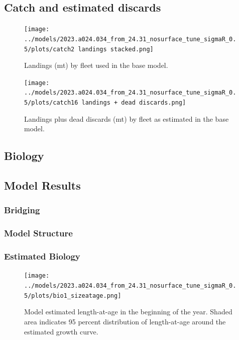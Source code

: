 \documentclass[11pt,
  english,
  letterpaper,
]{article}
\begin{document}
\hypertarget{catch-and-estimated-discards}{%
\subsection{Catch and estimated discards}\label{catch-and-estimated-discards}}

\begin{figure}
\centering
\texttt{[image: ../models/2023.a024.034\_from\_24.31\_nosurface\_tune\_sigmaR\_0.5/plots/catch2 landings stacked.png]}
\caption{Landings (mt) by fleet used in the base model.\label{fig:catch-figures-r4ss}}
\end{figure}

\begin{figure}
\centering
\texttt{[image: ../models/2023.a024.034\_from\_24.31\_nosurface\_tune\_sigmaR\_0.5/plots/catch16 landings + dead discards.png]}
\caption{Landings plus dead discards (mt) by fleet as estimated in the base model.\label{fig:catchdiscard-figures-r4ss}}
\end{figure}

\hypertarget{biology}{%
\subsection{Biology}\label{biology}}

\hypertarget{model-results}{%
\subsection{Model Results}\label{model-results}}

\hypertarget{bridging}{%
\subsubsection{Bridging}\label{bridging}}

\hypertarget{model-structure}{%
\subsubsection{Model Structure}\label{model-structure}}

\hypertarget{estimated-biology}{%
\subsubsection{Estimated Biology}\label{estimated-biology}}

\begin{figure}
\centering
\texttt{[image: ../models/2023.a024.034\_from\_24.31\_nosurface\_tune\_sigmaR\_0.5/plots/bio1\_sizeatage.png]}
\caption{Model estimated length-at-age in the beginning of the year. Shaded area indicates 95 percent distribution of length-at-age around the estimated growth curve.\label{fig:mod-est-len-age}}
\end{figure}
\end{document}
